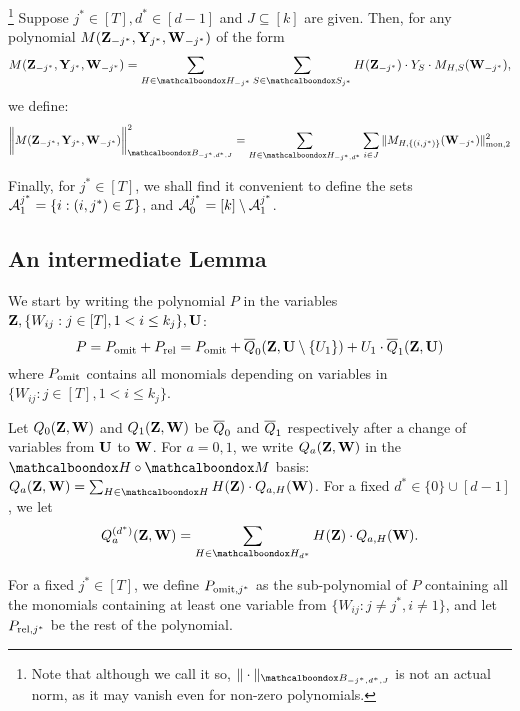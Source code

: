 \begin{definition}\footnote{Note that although we call it so, $\|\cdot\|_{\mcb{B}_{-j^*,d^*,J}}$ is not an actual norm, as it may vanish even for non-zero polynomials.}				\label{defn:norm-BasisB}
Suppose $j^* \in [T], d^* \in [d-1]$ and $J \subseteq [k]$ are given. Then, for any polynomial $M(\mbf{Z}_{-j^*},\mbf{Y}_{j^*}, \mbf{W}_{-j^*})$ of the form
\begin{equation*}
M(\mbf{Z}_{-j^*},\mbf{Y}_{j^*}, \mbf{W}_{-j^*}) = \sum_{H \in \mcb{H}_{-j^*}}\sum_{S \in \mcb{S}_{j^*}} H(\mbf{Z}_{-j^*}) \cdot Y_{S}\cdot M_{H,S}({\bf W}_{-j^*}),
\end{equation*}
we define: 
\begin{equation}
\bigg\|M(\mbf{Z}_{-j^*},\mbf{Y}_{j^*}, \mbf{W}_{-j^*}) \bigg\|^2_{\mcb{B}_{-j^*,d^*, J}} = \sum_{H \in \mcb{H}_{-j^*,d^*}}\sum_{i \in J} \|M_{H,\{(i,j^*)\}}({\bf W}_{-j^*})\|^2_{\rm mon,2} 
\end{equation}
\end{definition}


Finally, for $j^* \in [T]$, we shall find it convenient to define the sets $\mathcal{A}^{j^*}_1 = \{i : (i,j^*) \in  \mathcal{I}\}$, and $\mathcal{A}^{j^*}_0 = [k]\setminus \mathcal{A}^{j^*}_1$.




\subsection{An intermediate Lemma}
We start by writing the polynomial $P$ in the variables $\mbf{Z}, \{W_{ij}: j \in [T], 1 < i \leq k_j\}, \mbf{U}$:
$$P = P_{\tn{omit}} + P_{\tn{rel}} = P_{\tn{omit}} + \ol{Q}_0(\mbf{Z},\mbf{U}\setminus \{U_1\}) + U_1 \cdot \ol{Q}_1(\mbf{Z}, \mbf{U})$$
where $P_{\textnormal{omit}}$ contains all monomials depending on variables in $\{W_{ij}: j \in [T], 1 < i \leq k_j\}$. 

Let $Q_0(\mbf{Z}, \mbf{W})$ and $Q_1(\mbf{Z}, \mbf{W})$  be
$\overline{Q}_0$ and $\overline{Q}_1$ respectively after a change of variables from $\mbf{U}$ to $\mbf{W}$. For $a=0,1$, we write $Q_a(\mbf{Z},\mbf{W})$ in the $\mcb{H} \circ \mcb{M}$
basis: $Q_a(\mbf{Z}, \mbf{W}) = \sum_{H \in \mcb{H}} H(\mbf{Z}) \cdot Q_{a,H}(\mbf{W})$. For a fixed $d^* \in \{0\} \cup [d-1]$, we let
$$Q_a^{(d^*)}(\mbf{Z}, \mbf{W}) =  \sum_{H \in \mcb{H}_{d^*}} H(\mbf{Z}) \cdot Q_{a,H}(\mbf{W}).$$

For a fixed $j^* \in [T]$, we define $P_{{\rm omit},j^*}$ as the sub-polynomial of $P$ containing all the monomials containing at least one variable from $\{W_{ij}: j \ne j^*,i \ne 1\}$, and let $P_{{\rm rel},j^*}$ be the rest of the polynomial.


